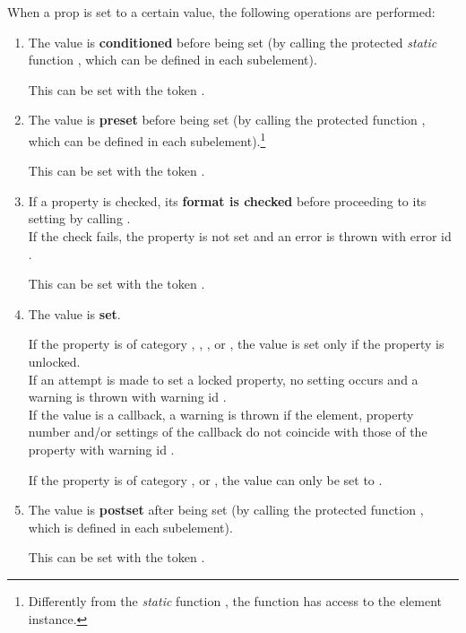 \documentclass{tufte-handout}
\begin{document}
When a prop is set to a certain value, the following operations are performed:
\begin{enumerate}

\item{} The value is {\bf conditioned} before being set (by calling the protected \emph{static} function , which can be defined in each subelement).
	
	This can be set with the token .
	
\item{} The value is {\bf preset} before being set (by calling the protected function , which can be defined in each subelement).\footnote{Differently from the \emph{static} function , the function  has access to the element instance.}

	This can be set with the token .
	
\item{} If a property is checked, its {\bf format is checked} before proceeding to its setting by calling .\\
	If the check fails, the property is not set and an error is thrown with error id .
	
	This can be set with the token .

\item{} The value is {\bf set}.

		If the property is of category , , , or , the value is set only if the property is unlocked.\\
		If an attempt is made to set a locked property, no setting occurs and a warning is thrown with warning id .\\
		If the value is a callback, a warning is thrown if the element, property number and/or settings of the callback do not coincide with those of the property with warning id .
 
		If the property is of category ,  or , the value can only be set to .

\item{} The value is {\bf postset} after being set (by calling the protected function , which is defined in each subelement).
	
	This can be set with the token .


\end{enumerate}
\end{document}
